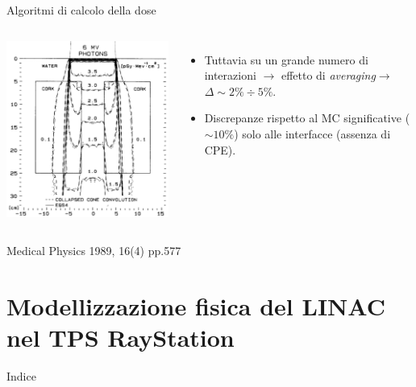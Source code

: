 \documentclass{beamer}
\begin{document}
\begin{frame}{Algoritmi di calcolo della dose}
\begin{columns}[t]
\includegraphics[width=\textwidth]{../cap1/kern_dens2_pres.png}
\scriptsize
\begin{itemize}
\item Tuttavia su un grande numero di interazioni $\rightarrow$ effetto di \textit{averaging}$\rightarrow$ $\Delta \sim 2\% \div 5\%$.
\item Discrepanze rispetto al MC significative ($\sim 10\%$) solo alle interfacce (assenza di CPE).
\end{itemize}
\end{columns}
\begin{flushright}
\tiny Medical Physics 1989, 16(4) pp.577
\end{flushright}
\vspace*{-.3cm}
\end{frame}



\section[Modellizzazione del LINAC]{Modellizzazione fisica del LINAC nel TPS RayStation}
\begin{frame}{Indice}
\tableofcontents[currentsection]
\end{frame}
\end{document}
